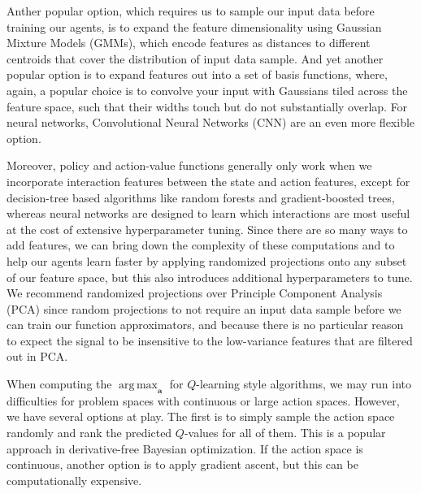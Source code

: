 \documentclass{article}
\DeclareMathOperator*{\argmax}{arg\,max}
\begin{document}
Anther popular option, which requires us to sample our input data before training our agents, is to expand the feature dimensionality using Gaussian Mixture Models (GMMs), which encode features as distances to different centroids that cover the distribution of input data sample. And yet another popular option is to expand features out into a set of basis functions, where, again, a popular choice is to convolve your input with Gaussians tiled across the feature space, such that their widths touch but do not substantially overlap. For neural networks, Convolutional Neural Networks (CNN) are an even more flexible option.

Moreover, policy and action-value functions generally only work when we incorporate interaction features between the state and action features, except for decision-tree based algorithms like random forests and gradient-boosted trees, whereas neural networks are designed to learn which interactions are most useful at the cost of extensive hyperparameter tuning. Since there are so many ways to add features, we can bring down the complexity of these computations and to help our agents learn faster by applying randomized projections onto any subset of our feature space, but this also introduces additional hyperparameters to tune. We recommend randomized projections over Principle Component Analysis (PCA) since random projections to not require an input data sample before we can train our function approximators, and because there is no particular reason to expect the signal to be insensitive to the low-variance features that are filtered out in PCA.

When computing the $\argmax_\mathbf{a}$ for $Q$-learning style algorithms, we may run into difficulties for problem spaces with continuous or large action spaces. However, we have several options at play. The first is to simply sample the action space randomly and rank the predicted $Q$-values for all of them. This is a popular approach in derivative-free Bayesian optimization. If the action space is continuous, another option is to apply gradient ascent, but this can be computationally expensive.
\end{document}
